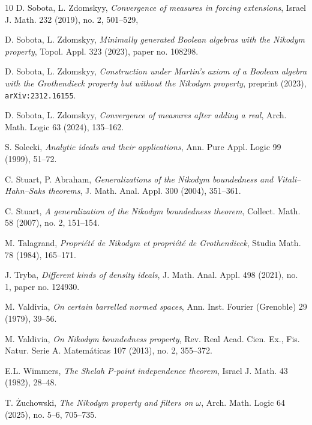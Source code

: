\documentclass[a4paper,11pt,fleqn]{amsart}
\theoremstyle{definition}
\theoremstyle{remark}
\numberwithin{equation}{section}
\begin{document}
\begin{thebibliography}{10}
 D. Sobota, L. Zdomskyy, \textit{Convergence of measures in forcing extensions}, Israel J. Math. 232 (2019), no. 2, 501--529,

 D. Sobota, L. Zdomskyy, \textit{Minimally generated Boolean algebras with the Nikodym property}, Topol. Appl. 323 (2023), paper no. 108298.

 D. Sobota, L. Zdomskyy, \textit{Construction under Martin's axiom of a Boolean algebra with the Grothendieck property but without the Nikodym property}, preprint (2023), \texttt{arXiv:2312.16155}.

 D. Sobota, L. Zdomskyy, \textit{Convergence of measures after adding a real}, Arch. Math. Logic 63 (2024), 135--162. 

 S. Solecki, \textit{Analytic ideals and their applications}, Ann. Pure Appl. Logic 99 (1999), 51--72.

 C. Stuart, P. Abraham, \textit{Generalizations of the Nikodym boundedness and Vitali--Hahn--Saks theorems}, J. Math. Anal. Appl. 300 (2004), 351--361.

 C. Stuart, \textit{A generalization of the Nikodym boundedness theorem}, Collect. Math. 58 (2007), no. 2, 151--154.

 M. Talagrand, \textit{Propri\'et\'e de Nikodym et propri\'et\'e de Grothendieck}, Studia Math. 78 (1984), 165--171.

 J. Tryba, \textit{Different kinds of density ideals}, J. Math. Anal. Appl. 498 (2021), no. 1, paper no. 124930.

 M. Valdivia, \textit{On certain barrelled normed spaces}, Ann. Inst. Fourier (Grenoble) 29 (1979), 39--56.

 M. Valdivia, \textit{On Nikodym boundedness property}, Rev. Real Acad. Cien. Ex., Fis. Natur. Serie A. Matem\'aticas 107 (2013), no. 2, 355--372.

 E.L. Wimmers, \textit{The Shelah P-point independence theorem}, Israel J. Math. 43 (1982), 28--48.

 T. \.{Z}uchowski, \textit{The Nikodym property and filters on $\omega$}, Arch. Math. Logic 64 (2025), no. 5--6, 705--735.

\end{thebibliography}
\end{document}
